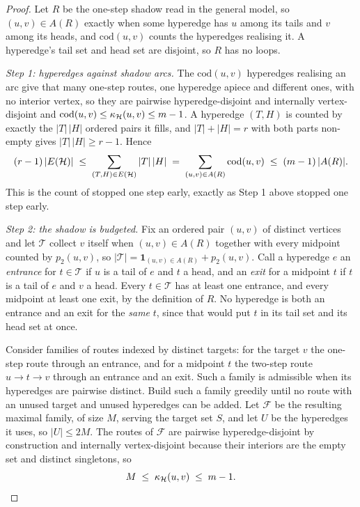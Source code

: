 \begin{proof}
Let $R$ be the one-step shadow read in the general model, so $(u,v) \in A(R)$
exactly when some hyperedge has $u$ among its tails and $v$ among its heads, and
$\mathrm{cod}(u,v)$ counts the hyperedges realising it. A hyperedge's tail set and
head set are disjoint, so $R$ has no loops.

\emph{Step 1: hyperedges against shadow arcs.} The $\mathrm{cod}(u,v)$ hyperedges
realising an arc give that many one-step routes, one hyperedge apiece and
different ones, with no interior vertex, so they are pairwise hyperedge-disjoint
and internally vertex-disjoint and $\mathrm{cod}(u,v) \le \kappa_{\mathcal{H}}(u,v) \le m-1$.
A hyperedge $(T,H)$ is counted by exactly the $|T|\,|H|$ ordered pairs it fills,
and $|T| + |H| = r$ with both parts non-empty gives $|T|\,|H| \ge r-1$. Hence
\[
    (r-1)\,|E(\mathcal{H})| \;\le\; \sum_{(T,H) \in E(\mathcal{H})} |T|\,|H|
    \;=\; \sum_{(u,v) \in A(R)} \mathrm{cod}(u,v) \;\le\; (m-1)\,|A(R)| .
\]
This is the count of  stopped one step early, exactly
as Step 1 above stopped  one step early.

\emph{Step 2: the shadow is budgeted.} Fix an ordered pair $(u,v)$ of distinct
vertices and let $\mathcal{T}$ collect $v$ itself when $(u,v) \in A(R)$ together
with every midpoint counted by $p_2(u,v)$, so
$|\mathcal{T}| = \mathbf{1}_{(u,v) \in A(R)} + p_2(u,v)$. Call a hyperedge $e$ an
\emph{entrance} for $t \in \mathcal{T}$ if $u$ is a tail of $e$ and $t$ a head,
and an \emph{exit} for a midpoint $t$ if $t$ is a tail of $e$ and $v$ a head.
Every $t \in \mathcal{T}$ has at least one entrance, and every midpoint at least
one exit, by the definition of $R$. No hyperedge is both an entrance and an exit
for the \emph{same} $t$, since that would put $t$ in its tail set and its head set
at once.

Consider families of routes indexed by distinct targets: for the target $v$ the
one-step route through an entrance, and for a midpoint $t$ the two-step route
$u \to t \to v$ through an entrance and an exit. Such a family is admissible when
its hyperedges are pairwise distinct. Build such a family greedily until no route with an unused target and unused hyperedges can be added. Let $\mathcal{F}$ be the resulting maximal family, of size $M$, serving the target set $S$, and let $U$ be the hyperedges it uses, so
$|U| \le 2M$. The routes of $\mathcal{F}$ are pairwise hyperedge-disjoint by
construction and internally vertex-disjoint because their interiors are the empty
set and distinct singletons, so
\[
    M \;\le\; \kappa_{\mathcal{H}}(u,v) \;\le\; m-1 .
\]


\end{proof}
